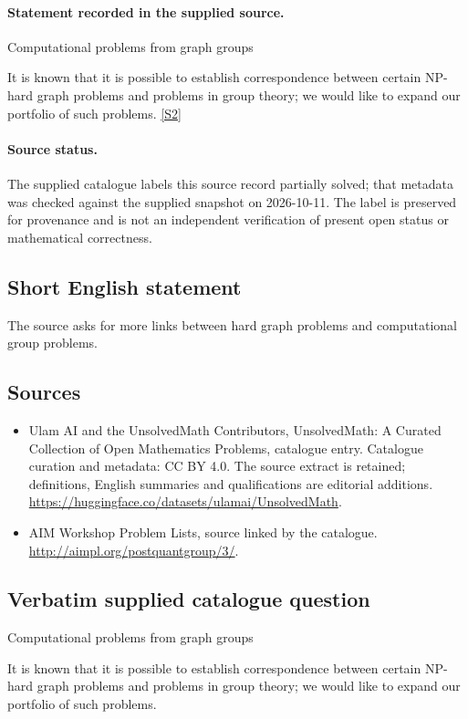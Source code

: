 \documentclass[11pt]{article}
\begin{document}
\paragraph{Statement recorded in the supplied source.}
Computational problems from graph groups

It is known that it is possible to establish correspondence between certain NP-hard graph problems and problems in group theory; we would like to expand our portfolio of such problems. \href{http://aimpl.org/postquantgroup/3/}{[S2]}
\paragraph{Source status.}
The supplied catalogue labels this source record partially solved; that metadata was checked against the supplied snapshot on 2026-10-11. The label is preserved for provenance and is not an independent verification of present open status or mathematical correctness.
\subsection{Short English statement}
The source asks for more links between hard graph problems and computational group problems.
\subsection{Sources}
\begin{itemize}
\item[S1] Ulam AI and the UnsolvedMath Contributors, UnsolvedMath: A Curated Collection of Open Mathematics Problems, catalogue entry. Catalogue curation and metadata: CC BY 4.0. The source extract is retained; definitions, English summaries and qualifications are editorial additions.
\url{https://huggingface.co/datasets/ulamai/UnsolvedMath}.
\item[S2] AIM Workshop Problem Lists, source linked by the catalogue.
\url{http://aimpl.org/postquantgroup/3/}.
\end{itemize}
\subsection{Verbatim supplied catalogue question}
Computational problems from graph groups

It is known that it is possible to establish correspondence between certain NP-hard graph problems and problems in group theory; we would like to expand our portfolio of such problems.
\end{document}
